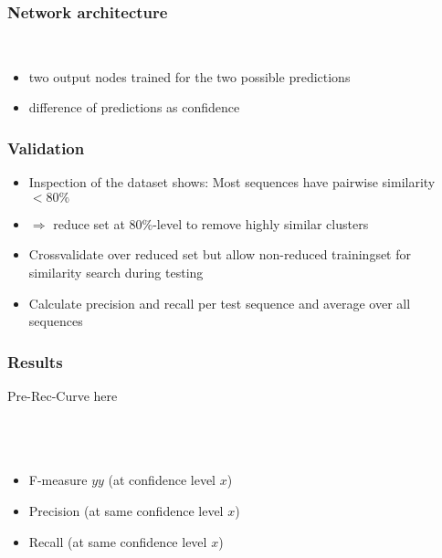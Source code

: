 \documentclass{beamer}
\begin{document}
\begin{frame}
	\frametitle{Network architecture}

	\hfill\\
	\begin{itemize}
		\item two output nodes trained for the two possible predictions
		\item difference of predictions as confidence
	\end{itemize}	
\end{frame}

\begin{frame}
	\frametitle{Validation}
	
	\begin{itemize}
		\item Inspection of the dataset shows: Most sequences have pairwise similarity $< 80\%$
		\item[] $\Rightarrow$ reduce set at $80\%$-level to remove highly similar clusters
		\item Crossvalidate over reduced set but allow non-reduced trainingset for similarity search during testing
		\item Calculate precision and recall per test sequence and average over all sequences
	\end{itemize}
\end{frame}

\begin{frame}
	\frametitle{Results}
	Pre-Rec-Curve here\\
	\hfill\\
	\hfill\\
	\hfill\\
	\begin{itemize}
		\item F-measure $yy$ (at confidence level $x$)
		\item Precision (at same confidence level $x$)
		\item Recall (at same confidence level $x$)
	\end{itemize}		
	
\end{frame}
\end{document}
